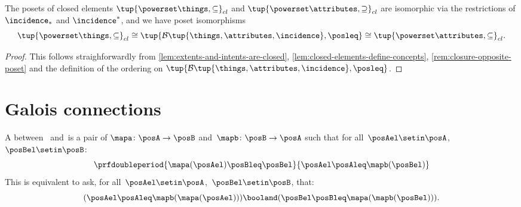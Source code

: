\begin{lemma}
The posets of closed elements $\tup{\powerset \things, \subseteq}_{cl}$ and $\tup{\powerset \attributes, \supseteq}_{cl}$ are isomorphic via the restrictions of $\incidence_*$ and $\incidence^*$, and we have poset isomorphisms
\begin{equation}
\tup{\powerset \things, \subseteq}_{cl} \cong \tup{\mathcal{B}\tup{\things, \attributes, \incidence}, \posleq}   \cong  \tup{\powerset \attributes, \subseteq}_{cl}.
\end{equation}
\end{lemma}

\begin{proof}
This follows straighforwardly from \cref{lem:extents-and-intents-are-closed}, \cref{lem:closed-elements-define-concepts}, \cref{rem:closure-opposite-poset} and the definition of the ordering on $\tup{\mathcal{B}\tup{\things, \attributes, \incidence}, \posleq}$. 
\end{proof}

\section{Galois connections}\label{sec:galois-connections}

\begin{ctdefinition}\label{def:monotone-galois-connection}
    A  between ~\posA and~\posB is a pair of 
    $\mapa\colon \posA\to \posB$ and~$\mapb\colon \posB\to \posA$ such that for all~$\posAel\setin \posA$,~$\posBel\setin \posB$:
    \begin{equation}
        \prfdoubleperiod{\mapa(\posAel) \posBleq \posBel}{\posAel \posAleq \mapb(\posBel)}
    \end{equation}
    This is equivalent to ask, for all~$\posAel\setin \posA$,~$\posBel\setin \posB$, that:
    \begin{equation}
        (\posAel\posAleq \mapb(\mapa(\posAel)))
        \booland (\posBel\posBleq \mapa(\mapb(\posBel))).
    \end{equation}
\end{ctdefinition}

